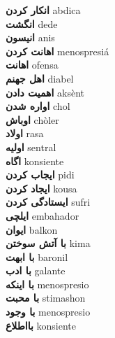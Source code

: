 \textbf{ انکار کردن  } abdica \\
\textbf{ انگشت  } dede \\
\textbf{ انیسون  } anis \\
\textbf{ اهانت کردن  } menospresiá \\
\textbf{ اهانت  } ofensa \\
\textbf{ اهل جهنم  } diabel \\
\textbf{ اهمیت دادن  } aksènt \\
\textbf{ اواره شدن  } chol \\
\textbf{ اوباش  } chòler \\
\textbf{ اولاد  } rasa \\
\textbf{ اولیه  } sentral \\
\textbf{ اگاه  } konsiente \\
\textbf{ ایجاب کردن  } pidi \\
\textbf{ ایجاد کردن  } kousa \\
\textbf{ ایستادگی کردن  } sufri \\
\textbf{ ایلچی  } embahador \\
\textbf{ ایوان  } balkon \\
\textbf{ با آتش سوختن  } kima \\
\textbf{ با ابهت  } baronil \\
\textbf{ با ادب  } galante \\
\textbf{ با اینکه  } menospresio \\
\textbf{ با محبت  } stimashon \\
\textbf{ با وجود  } menospresio \\
\textbf{ بااطلاع  } konsiente \\
